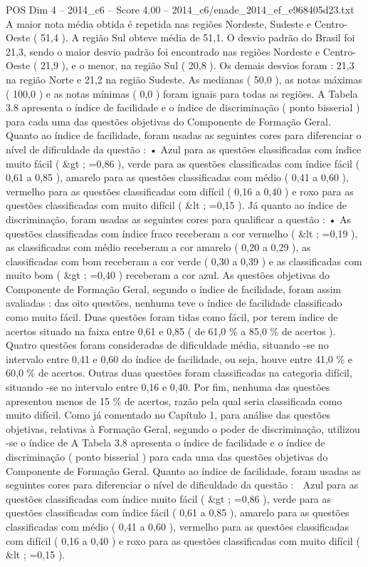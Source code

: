 \begin{textsample}{POS Dim 4 – 2014\_c6 – Score 4.00 – 2014\_c6/enade\_2014\_ef\_e968405d23.txt}
A maior nota média obtida é repetida nas regiões Nordeste, Sudeste e Centro-Oeste ( 51,4 ).
A região Sul obteve média de 51,1.
O desvio padrão do Brasil foi 21,3, sendo o maior desvio padrão foi encontrado nas regiões Nordeste e Centro-Oeste ( 21,9 ), e o menor, na região Sul ( 20,8 ).
Os demais desvios foram : 21,3 na região Norte e 21,2 na região Sudeste.
As medianas ( 50,0 ), as notas máximas ( 100,0 ) e as notas mínimas ( 0,0 ) foram iguais para todas as regiões.
A Tabela 3.8 apresenta o índice de facilidade e o índice de discriminação ( ponto bisserial ) para cada uma das questões objetivas do Componente de Formação Geral.
Quanto ao índice de facilidade, foram usadas as seguintes cores para diferenciar o nível de dificuldade da questão : • Azul para as questões classificadas com índice muito fácil ( \&gt ; =0,86 ), verde para as questões classificadas com índice fácil ( 0,61 a 0,85 ), amarelo para as questões classificadas com médio ( 0,41 a 0,60 ), vermelho para as questões classificadas com difícil ( 0,16 a 0,40 ) e roxo para as questões classificadas com muito difícil ( \&lt ; =0,15 ).
Já quanto ao índice de discriminação, foram usadas as seguintes cores para qualificar a questão : • As questões classificadas com índice fraco receberam a cor vermelho ( \&lt ; =0,19 ), as classificadas com médio receberam a cor amarelo ( 0,20 a 0,29 ), as classificadas com bom receberam a cor verde ( 0,30 a 0,39 ) e as classificadas com muito bom ( \&gt ; =0,40 ) receberam a cor azul.
As questões objetivas do Componente de Formação Geral, segundo o índice de facilidade, foram assim avaliadas : das oito questões, nenhuma teve o índice de facilidade classificado como muito fácil.
Duas questões foram tidas como fácil, por terem índice de acertos situado na faixa entre 0,61 e 0,85 ( de 61,0 \% a 85,0 \% de acertos ).
Quatro questões foram consideradas de dificuldade média, situando -se no intervalo entre 0,41 e 0,60 do índice de facilidade, ou seja, houve entre 41,0 \% e 60,0 \% de acertos.
Outras duas questões foram classificadas na categoria difícil, situando -se no intervalo entre 0,16 e 0,40.
Por fim, nenhuma das questões apresentou menos de 15 \% de acertos, razão pela qual seria classificada como muito difícil.
Como já comentado no Capítulo 1, para análise das questões objetivas, relativas à Formação Geral, segundo o poder de discriminação, utilizou -se o índice de A Tabela 3.8 apresenta o índice de facilidade e o índice de discriminação ( ponto bisserial ) para cada uma das questões objetivas do Componente de Formação Geral.
Quanto ao índice de facilidade, foram usadas as seguintes cores para diferenciar o nível de dificuldade da questão :  Azul para as questões classificadas com índice muito fácil ( \&gt ; =0,86 ), verde para as questões classificadas com índice fácil ( 0,61 a 0,85 ), amarelo para as questões classificadas com médio ( 0,41 a 0,60 ), vermelho para as questões classificadas com difícil ( 0,16 a 0,40 ) e roxo para as questões classificadas com muito difícil ( \&lt ; =0,15 ).

\end{textsample}
